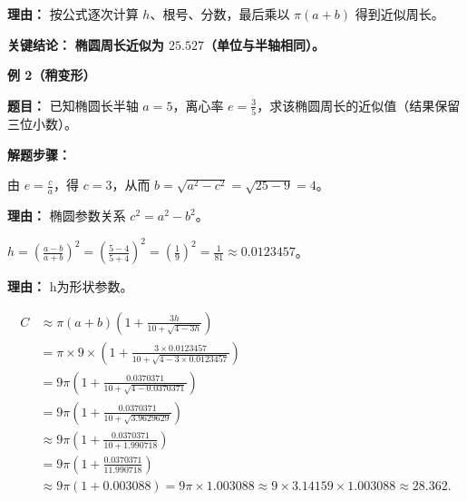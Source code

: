 \begin{examplebox}
\begin{description}[style=nextline, leftmargin=2.8em, labelsep=0.5em, itemsep=0.45em]
		      \par\textbf{理由：} 按公式逐次计算 $h$、根号、分数，最后乘以 $\pi(a+b)$ 得到近似周长。
	\end{description}

	\textbf{\textcolor{CExample}{关键结论：}} \textbf{椭圆周长近似为 $25.527$（单位与半轴相同）。}

	\medskip

	\textbf{\textcolor{CExample}{例 2（稍变形）}}

	\textbf{\textcolor{CExample}{题目：}} 已知椭圆长半轴 $a=5$，离心率 $e=\frac{3}{5}$，求该椭圆周长的近似值（结果保留三位小数）。

	\textbf{\textcolor{CExample}{解题步骤：}}

	\begin{description}[style=nextline, leftmargin=2.8em, labelsep=0.5em, itemsep=0.45em]
		\item[\textbf{第一步（求短半轴）：}]
		      由 $e=\frac{c}{a}$，得 $c=3$，从而 $b=\sqrt{a^2-c^2}=\sqrt{25-9}=4$。

		      \par\textbf{理由：} 椭圆参数关系 $c^2=a^2-b^2$。

		\item[\textbf{第二步（计算h）：}]
		      $h=\left(\frac{a-b}{a+b}\right)^2=\left(\frac{5-4}{5+4}\right)^2=\left(\frac{1}{9}\right)^2=\frac{1}{81}\approx0.0123457$。

		      \par\textbf{理由：} h为形状参数。

		\item[\textbf{第三步（代入公式）：}]
		      \[
			      \begin{aligned}
				      C & \approx \pi(a+b)\left(1+\frac{3h}{10+\sqrt{4-3h}}\right)                                           \\
				        & = \pi\times9\times\left(1+\frac{3\times0.0123457}{10+\sqrt{4-3\times0.0123457}}\right)             \\
				        & = 9\pi\left(1+\frac{0.0370371}{10+\sqrt{4-0.0370371}}\right)                                       \\
				        & = 9\pi\left(1+\frac{0.0370371}{10+\sqrt{3.9629629}}\right)                                         \\
				        & \approx 9\pi\left(1+\frac{0.0370371}{10+1.990718}\right)                                           \\
				        & = 9\pi\left(1+\frac{0.0370371}{11.990718}\right)                                                   \\
				        & \approx 9\pi(1+0.003088) = 9\pi\times1.003088 \approx 9\times3.14159\times1.003088 \approx 28.362.
			      \end{aligned}
		      \]


\end{description}
\end{examplebox}
